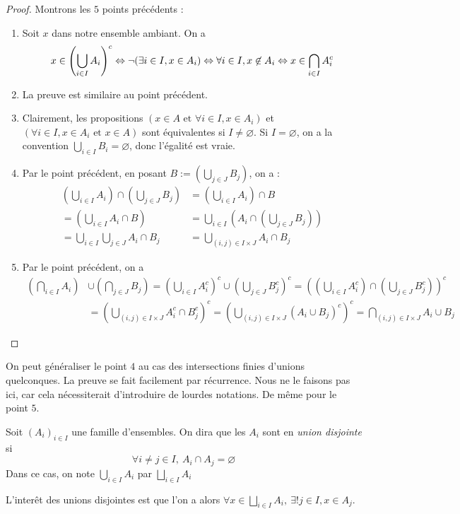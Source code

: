 \begin{proof}
    Montrons les $5$ points précédents :
    \begin{enumerate}
        \item Soit $x$ dans notre ensemble ambiant. On a
        \[
        x\in\left(\bigcup_{i\in I}A_i\right)^c\Leftrightarrow\neg(\exists i\in I,x\in A_i)\Leftrightarrow \forall i\in I, x\not\in A_i\Leftrightarrow x\in\bigcap_{i\in I}A_i^c
        \]
        \item La preuve est similaire au point précédent.
        \item Clairement, les propositions $(x\in A \text{ et }\forall i\in I, x\in A_i)$ et $(\forall i\in I, x\in A_i\text{ et } x\in A)$ sont équivalentes si $I\ne\varnothing$. Si $I = \varnothing$, on a la convention $\bigcup_{i\in I}B_i = \varnothing$, donc l'égalité est vraie.
        \item Par le point précédent, en posant $B:=\left(\bigcup _{j\in J}B_j\right)$, on a : \begin{align*}
            \left(\bigcup _{i\in I}A_i\right)\cap\left(\bigcup _{j\in J}B_j\right) &=   \left(\bigcup _{i\in I}A_i\right)\cap B\\
             = \left(\bigcup _{i\in I}A_i\cap B\right) &= \bigcup_{i\in I}\left(A_i\cap\left(\bigcup _{j\in J}B_j\right)\right)\\
    =\bigcup _{i\in I}\bigcup _{j\in J}A_i\cap B_j&=\bigcup _{(i,j)\in I\times J}A_i\cap B_j
        \end{align*}
        \item Par le point précédent, on a
        \begin{align*}
            \left(\bigcap _{i\in I}A_i\right)&\cup\left(\bigcap _{j\in J}B_j\right) = \left(\bigcup _{i\in I}A_i^c\right)^c\cup\left(\bigcup _{j\in J}B_j^c\right) ^c = \left(\left(\bigcup _{i\in I}A_i^c\right)\cap\left(\bigcup _{j\in J}B_j^c\right) \right)^c \\
            &= \left(\bigcup _{(i,j)\in I\times J}A_i^c\cap B_j^c\right)^c = \left(\bigcup _{(i,j)\in I\times J}(A_i\cup B_j)^c\right)^c=\bigcap _{(i,j)\in I\times J}A_i\cup B_j
        \end{align*}
    \end{enumerate}
\end{proof}
\begin{remarque}
    On peut généraliser le point $4$ au cas des intersections finies d'unions quelconques. La preuve se fait facilement par récurrence. Nous ne le faisons pas ici, car cela nécessiterait d'introduire de lourdes notations. De même pour le point $5$.
\end{remarque}
\begin{definition}\label{ens : opérations : unions_disjointes}
    Soit $(A_i)_{i\in I}$ une famille d'ensembles. On dira que les $A_i$ sont en \emph{union disjointe} si $$\forall i\ne j\in I,\ A_{i}\cap A_{j} =\varnothing $$Dans ce cas, on note $\bigcup_{i\in I} A_i$ par $\bigsqcup_{i\in I}A_i$
\end{definition}
\begin{remarque}
    L'interêt des unions disjointes est que l'on a alors $\forall x\in\bigsqcup_{i\in I}A_i,\ \exists ! j\in I, x\in A_j$.
\end{remarque}
